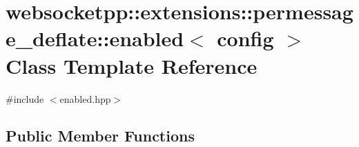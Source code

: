 \hypertarget{classwebsocketpp_1_1extensions_1_1permessage__deflate_1_1enabled}{}\section{websocketpp\+:\+:extensions\+:\+:permessage\+\_\+deflate\+:\+:enabled$<$ config $>$ Class Template Reference}
\label{classwebsocketpp_1_1extensions_1_1permessage__deflate_1_1enabled}


{\ttfamily \#include $<$enabled.\+hpp$>$}

\subsection*{Public Member Functions}
